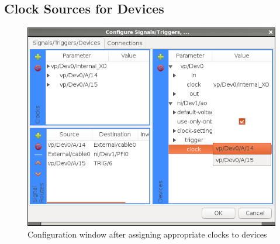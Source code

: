 \subsection{Clock Sources for Devices}\label{sec:devcfg:clksrc}

\begin{figure}[ht]
  \centerline{\includegraphics[width=.5\textwidth]{figures/devices-set-clocks}}
  \caption{Configuration window after assigning appropriate clocks to
  devices}
  \label{fig:devcfg:devices-set-clocks}
\end{figure}

